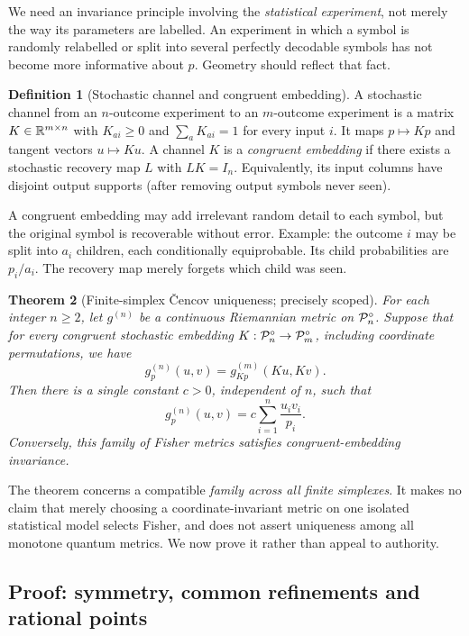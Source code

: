 \documentclass[11pt]{article}
\newtheorem{theorem}{Theorem}[section]
\theoremstyle{definition}\newtheorem{definition}[theorem]{Definition}\newtheorem{exercise}{Problem}[section]
\begin{document}
We need an invariance principle involving the \emph{statistical experiment}, not merely the way its parameters are labelled. An experiment in which a symbol is randomly relabelled or split into several perfectly decodable symbols has not become more informative about $p$. Geometry should reflect that fact.

\begin{definition}[Stochastic channel and congruent embedding]
A stochastic channel from an $n$-outcome experiment to an $m$-outcome experiment is a matrix $K\in\mathbb R^{m\times n}$ with $K_{ai}\ge0$ and $\sum_a K_{ai}=1$ for every input $i$. It maps $p\mapsto Kp$ and tangent vectors $u\mapsto Ku$. A channel $K$ is a \emph{congruent embedding} if there exists a stochastic recovery map $L$ with $LK=I_n$. Equivalently, its input columns have disjoint output supports (after removing output symbols never seen).
\end{definition}

A congruent embedding may add irrelevant random detail to each symbol, but the original symbol is recoverable without error. Example: the outcome $i$ may be split into $a_i$ children, each conditionally equiprobable. Its child probabilities are $p_i/a_i$. The recovery map merely forgets which child was seen.

\begin{theorem}[Finite-simplex \v{C}encov uniqueness; precisely scoped]\label{thm:chentsov}
For each integer $n\ge2$, let $g^{(n)}$ be a continuous Riemannian metric on $\mathcal P_n^\circ$. Suppose that for every congruent stochastic embedding $K:\mathcal P_n^\circ\to\mathcal P_m^\circ$, including coordinate permutations, we have
\[
 g^{(n)}_p(u,v)=g^{(m)}_{Kp}(Ku,Kv).
\]
Then there is a single constant $c>0$, independent of $n$, such that
\begin{equation}\label{eq:fisher-unique}
 \boxed{\quad g^{(n)}_p(u,v)=c\sum_{i=1}^n\frac{u_iv_i}{p_i}.\quad}
\end{equation}
Conversely, this family of Fisher metrics satisfies congruent-embedding invariance.
\end{theorem}

The theorem concerns a compatible \emph{family across all finite simplexes}. It makes no claim that merely choosing a coordinate-invariant metric on one isolated statistical model selects Fisher, and does not assert uniqueness among all monotone quantum metrics. We now prove it rather than appeal to authority.

\subsection{Proof: symmetry, common refinements and rational points}
\end{document}
